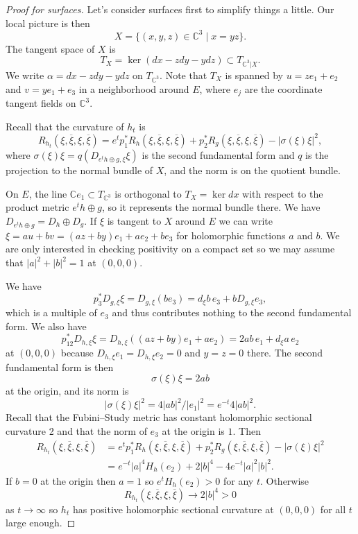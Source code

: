 \documentclass[10pt,a4paper]{amsart}
\newcommand{\kk}[1]{\mathbb{#1}}
\def\ov#1{\overline{#1}}
\def\hsc{holomorphic sectional curvature}
\begin{document}
\begin{proof}[Proof for surfaces]
Let's consider surfaces first to simplify things a little.
Our local picture is then
$$
X
= \{ (x, y, z) \in \kk C^3
\mid x = yz \}.
$$
The tangent space of $X$ is
$$
T_{X} = \ker(dx - z dy - y dz) \subset T_{\kk C^3|X}.
$$
We write $\alpha = dx - z dy - y dz$ on $T_{\kk C^3}$.
Note that $T_X$ is spanned by $u = z e_1 + e_2$ and $v = y e_1 + e_3$ in a
neighborhood around $E$, where $e_j$ are the coordinate tangent fields on $\kk
C^3$.

Recall that the curvature of $h_t$ is
$$
R_{h_t}(\xi, \ov\xi, \xi, \ov\xi)
= e^t p_1^* R_h(\xi, \ov\xi, \xi, \ov\xi)
+ p_2^* R_g(\xi, \ov\xi, \xi, \ov\xi)
- |\sigma(\xi)\xi|^2,
$$
where $\sigma(\xi)\xi = q(D_{e^th \oplus g,\xi} \xi)$ is the second fundamental
form and $q$ is the projection to the normal bundle of $X$, and the norm is on
the quotient bundle.

On $E$, the line $\kk C e_1 \subset T_{\kk C^3}$ is orthogonal to $T_X =
\ker dx$ with respect to the product metric $e^t h \oplus g$, so it represents
the normal bundle there.
We have $D_{e^th \oplus g} = D_h \oplus D_g$.
If $\xi$ is tangent to $X$ around $E$ we can write $\xi = a u + bv = (az + by)
e_1 + a e_2 + b e_3$ for holomorphic functions $a$ and $b$. We are only
interested in checking positivity on a compact set so we may assume that $|a|^2
+ |b|^2 = 1$ at $(0,0,0)$.

We have
$$
p_3^* D_{g,\xi} \xi
= D_{g,\xi} (be_3)
= d_\xi b \, e_3 + b D_{g,\xi} e_3,
$$
which is a multiple of $e_3$ and thus contributes nothing to the second
fundamental form.
We also have
$$
p_{12}^* D_{h,\xi}\xi
= D_{h,\xi}((az + by) e_1 + ae_2)
= 2ab \, e_1 + d_\xi a \, e_2
$$
at $(0,0,0)$ because $D_{h,\xi} e_1 = D_{h,\xi} e_2 = 0$ and $y = z = 0$ there.
The second fundamental form is then
$$
\sigma(\xi)\xi = 2 ab
$$
at the origin, and its norm is
$$
|\sigma(\xi)\xi|^2
= 4 |ab|^2 / |e_1|^2
= e^{-t} 4 |ab|^2.
$$
Recall that the Fubini--Study metric has constant \hsc{} 2 and that the norm of
$e_3$ at the origin is $1$. Then
\begin{align*}
R_{h_t}(\xi, \ov\xi, \xi, \ov\xi)
&= e^t p_1^* R_h(\xi, \ov\xi, \xi, \ov\xi)
+ p_2^* R_g(\xi, \ov\xi, \xi, \ov\xi)
- |\sigma(\xi)\xi|^2
\\
&= e^{-t} |a|^4 H_h(e_2)
+ 2 |b|^4
- 4 e^{-t} |a|^2|b|^2.
\end{align*}
If $b = 0$ at the origin then $a = 1$ so $e^t H_h(e_2) > 0$ for any $t$.
Otherwise
$$
R_{h_t}(\xi, \ov\xi, \xi, \ov\xi) \to 2|b|^4 > 0
$$
as $t \to \infty$ so $h_t$ has positive \hsc{} at $(0,0,0)$ for all $t$ large
enough.
\end{proof}
\end{document}
